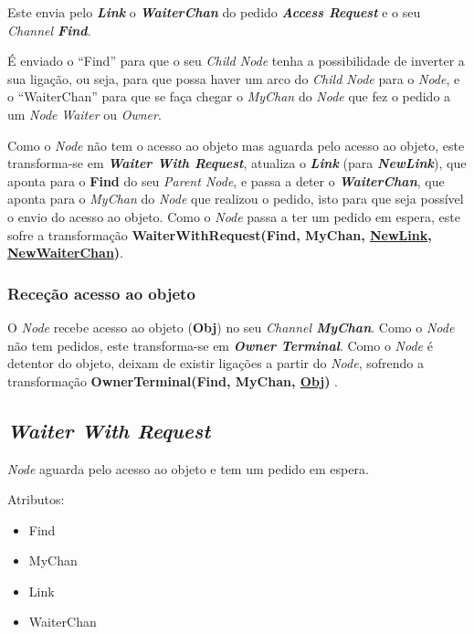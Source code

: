 Este envia pelo \textbf{\emph{Link}} o \textbf{\emph{WaiterChan}} do pedido \emph{\textbf{Access Request}} e o seu \emph{Channel \textbf{Find}}.

É enviado o ``Find'' para que o seu \emph{Child Node} tenha a possibilidade de inverter a sua ligação, ou seja, para que possa haver um arco do \emph{Child Node} para o \emph{Node}, 
e o ``WaiterChan'' para que se faça chegar o \emph{MyChan} do \emph{Node} que fez o pedido a um \emph{Node} \emph{Waiter} ou \emph{Owner}.


Como o \emph{Node} não tem o acesso ao objeto mas aguarda pelo acesso ao objeto, este transforma-se em \emph{\textbf{Waiter With Request}}, atualiza o \textbf{\emph{Link}} (para \textbf{\emph{NewLink}}),
que aponta para o \textbf{Find} do seu \emph{Parent Node}, 
e passa a deter o \textbf{\emph{WaiterChan}}, que aponta para o \emph{MyChan} do \emph{Node} que realizou o pedido, isto para que seja possível o envio do acesso ao objeto.
Como o \emph{Node} passa a ter um pedido em espera, este sofre a transformação \textbf{WaiterWithRequest(Find, MyChan, \underline{NewLink}, \underline{NewWaiterChan})}.


\subsubsection*{Receção acesso ao objeto}
O \emph{Node} recebe acesso ao objeto (\textbf{Obj}) no seu \emph{Channel \textbf{MyChan}}.
Como o \emph{Node} não tem pedidos, este transforma-se em \textbf{\emph{Owner Terminal}}.
Como o \emph{Node} é detentor do objeto, deixam de existir ligações a partir do \emph{Node}, sofrendo a transformação \textbf{ OwnerTerminal(Find, MyChan, \underline{Obj}) }.




\subsection{\emph{Waiter With Request}}
\label{especificacao:nodes:waiter_with_request}

\emph{Node} aguarda pelo acesso ao objeto e tem um pedido em espera.


Atributos:
\begin{itemize}
    \item Find 
    \item MyChan 
    \item Link 
    \item WaiterChan 
\end{itemize}




